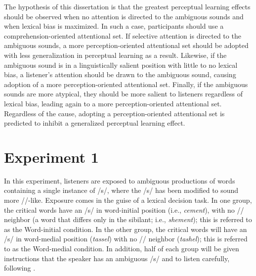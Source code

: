 The hypothesis of this dissertation is that the greatest perceptual learning effects should be observed when no attention is directed to the ambiguous sounds and when lexical bias is maximized.  
In such a case, participants should use a comprehension-oriented attentional set.  
If selective attention is directed to the ambiguous sounds, a more perception-oriented attentional set should be adopted with less generalization in perceptual learning as a result. 
Likewise, if the ambiguous sound is in a linguistically salient position with little to no lexical bias, a listener's attention should be drawn to the ambiguous sound, causing adoption of a more perception-oriented attentional set.  
Finally, if the ambiguous sounds are more atypical, they should be more salient to listeners regardless of lexical bias, leading again to a more perception-oriented attentional set.  
Regardless of the cause, adopting a perception-oriented attentional set is predicted to inhibit a generalized perceptual learning effect.

\section{Experiment 1}

In this experiment, listeners are exposed to ambiguous productions of words containing a single instance of /s/, where the /s/ has been modified to sound more /\textesh/-like.
Exposure comes in the guise of a lexical decision task. 
In one group, the critical words have an /s/ in word-initial position (i.e., \emph{cement}), with no /\textesh/ neighbor (a word that differs only in the sibilant; i.e., \emph{shement}); this is referred to as the Word-initial condition.  
In the other group, the critical words will have an /s/ in word-medial position (\emph{tassel}) with no /\textesh/ neighbor (\emph{tashel}); this is referred to as the Word-medial condition.  
In addition, half of each group will be given instructions that the speaker has an ambiguous /s/ and to listen carefully, following \citet{Pitt2012}.


